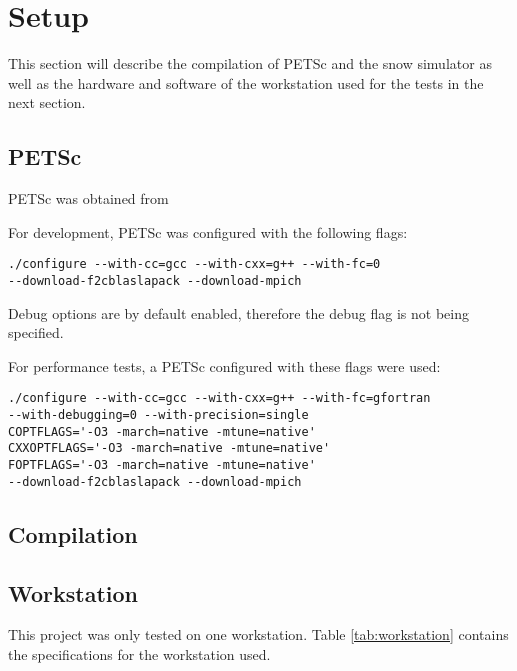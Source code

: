 \section{Setup}

This section will describe the compilation of PETSc and the snow simulator as well 
as the hardware and software of the workstation used for the tests in the next section. 

\subsection{PETSc}

PETSc was obtained from 

For development, PETSc was configured with the following flags:
\lstset{language=bash}
\begin{lstlisting}
./configure --with-cc=gcc --with-cxx=g++ --with-fc=0 
--download-f2cblaslapack --download-mpich
\end{lstlisting}
Debug options are by default enabled, therefore the debug flag is not being specified.

For performance tests, a PETSc configured with these flags were used:
\lstset{language=bash}
\begin{lstlisting}
./configure --with-cc=gcc --with-cxx=g++ --with-fc=gfortran 
--with-debugging=0 --with-precision=single
COPTFLAGS='-O3 -march=native -mtune=native' 
CXXOPTFLAGS='-O3 -march=native -mtune=native' 
FOPTFLAGS='-O3 -march=native -mtune=native' 
--download-f2cblaslapack --download-mpich
\end{lstlisting}

\subsection{Compilation}

\subsection{Workstation}

This project was only tested on one workstation. Table \ref{tab:workstation} contains 
the specifications for the workstation used.

